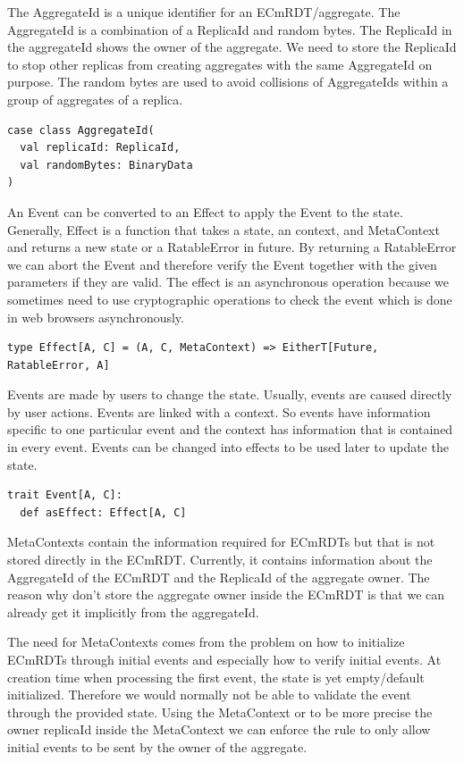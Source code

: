 \documentclass[
	ngerman,
	ruledheaders=section,   %
	class=report,		    %
	thesis={type=bachelor}, %
	accentcolor=9c,			%
	custommargins=true,    %
	marginpar=false,        %
	parskip=half-,          %
	fontsize=11pt,          %
]{tudapub}
\begin{document}
The AggregateId is a unique identifier for an ECmRDT/aggregate. The AggregateId is a combination of a ReplicaId and random bytes. The ReplicaId in the aggregateId shows the owner of the aggregate. We need to store the ReplicaId to stop other replicas from creating aggregates with the same AggregateId on purpose. The random bytes are used to avoid collisions of AggregateIds within a group of aggregates of a replica.

\begin{lstlisting}
case class AggregateId(
  val replicaId: ReplicaId,
  val randomBytes: BinaryData
)
\end{lstlisting}

An Event can be converted to an Effect to apply the Event to the state. Generally, Effect is a function that takes a state, an context, and MetaContext and returns a new state or a RatableError in future. By returning a RatableError we can abort the Event and therefore verify the Event together with the given parameters if they are valid. The effect is an asynchronous operation because we sometimes need to use cryptographic operations to check the event which is done in web browsers asynchronously.

\begin{lstlisting}
type Effect[A, C] = (A, C, MetaContext) => EitherT[Future, RatableError, A]
\end{lstlisting}

Events are made by users to change the state. Usually, events are caused directly by user actions. Events are linked with a context. So events have information specific to one particular event and the context has information that is contained in every event. Events can be changed into effects to be used later to update the state.

\begin{lstlisting}
trait Event[A, C]:
  def asEffect: Effect[A, C]
\end{lstlisting}

MetaContexts contain the information required for ECmRDTs but that is not stored directly in the ECmRDT. Currently, it contains information about the AggregateId of the ECmRDT and the ReplicaId of the aggregate owner. The reason why don't store the aggregate owner inside the ECmRDT is that we can already get it implicitly from the aggregateId.

The need for MetaContexts comes from the problem on how to initialize ECmRDTs through initial events and especially how to verify initial events. At creation time when processing the first event, the state is yet empty/default initialized. Therefore we would normally not be able to validate the event through the provided state. Using the MetaContext or to be more precise the owner replicaId inside the MetaContext we can enforce the rule to only allow initial events to be sent by the owner of the aggregate.
\end{document}
